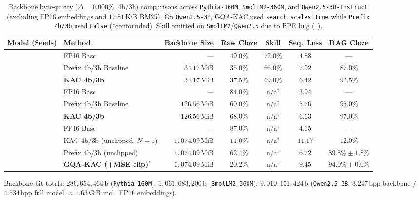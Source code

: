 \documentclass[10pt]{article} %
\newcommand{\gqakac}{\textsc{GQA-KAC}}
\newcommand{\bpp}{\mathrm{bpp}}
\begin{document}
\begin{table}[t]
\caption{Backbone byte-parity ($\Delta = 0.000\%$, 4b/3b) comparisons across \texttt{Pythia-160M}, \texttt{SmolLM2-360M}, and \texttt{Qwen2.5-3B-Instruct} (excluding FP16 embeddings and $17.81\,\text{KiB}$ BM25). On \texttt{Qwen2.5-3B}, \gqakac{} used \texttt{search\_scales=True} while \texttt{Prefix 4b/3b} used \texttt{False} ($*$confounded). Skill omitted on \texttt{SmolLM2}/\texttt{Qwen2.5} due to BPE bug ($\dagger$).}
\label{tab:matched_budget}
\begin{center}
\footnotesize\setlength{\tabcolsep}{3pt}
\begin{tabular}{l l r c c c c}
\toprule
\textbf{Model (Seeds)} & \textbf{Method} & \textbf{Backbone Size} & \textbf{Raw Cloze} & \textbf{Skill} & \textbf{Seq.\ Loss} & \textbf{RAG Cloze} \\
\midrule
{}
 & FP16 Base & --- & $49.0\%$ & $72.0\%$ & $4.88$ & --- \\
 & Prefix 4b/3b Baseline & $34.17\,\text{MiB}$ & $35.0\%$ & $66.0\%$ & $7.92$ & $87.0\%$ \\
 & \textbf{KAC 4b/3b} & $34.17\,\text{MiB}$ & $\mathbf{37.5\%}$ & $\mathbf{69.0\%}$ & $\mathbf{6.42}$ & $\mathbf{92.5\%}$ \\
\midrule
{}
 & FP16 Base & --- & $84.0\%$ & n/a$^\dagger$ & $3.94$ & --- \\
 & Prefix 4b/3b Baseline & $126.56\,\text{MiB}$ & $60.0\%$ & n/a$^\dagger$ & $\mathbf{5.76}$ & $96.0\%$ \\
 & \textbf{KAC 4b/3b} & $126.56\,\text{MiB}$ & $\mathbf{68.0\%}$ & n/a$^\dagger$ & $6.63$ & $\mathbf{97.0\%}$ \\
\midrule
{}
 & FP16 Base & --- & $87.0\%$ & n/a$^\dagger$ & $4.15$ & --- \\
 & KAC 4b/3b (unclipped, $N=1$) & $1{,}074.09\,\text{MiB}$ & $11.0\%$ & n/a$^\dagger$ & $11.17$ & $12.0\%$ \\
 & Prefix 4b/3b (unclipped) & $1{,}074.09\,\text{MiB}$ & $\mathbf{62.4\%}$ & n/a$^\dagger$ & $\mathbf{6.72}$ & $89.8\% \pm 1.8\%$ \\
 & \textbf{GQA-KAC (+MSE clip)}$^*$ & $1{,}074.09\,\text{MiB}$ & $20.2\%$ & n/a$^\dagger$ & $9.45$ & $\mathbf{94.0\% \pm 0.0\%}$ \\
\bottomrule
\end{tabular}
\par\vspace{2pt}
\parbox{\linewidth}{\scriptsize Backbone bit totals: $286{,}654{,}464\,\text{b}$ (\texttt{Pythia-160M}), $1{,}061{,}683{,}200\,\text{b}$ (\texttt{SmolLM2-360M}), $9{,}010{,}151{,}424\,\text{b}$ (\texttt{Qwen2.5-3B}: $3.247\,\bpp$ backbone / $4.534\,\bpp$ full model $\approx 1.63\,\text{GiB}$ incl.\ FP16 embeddings).}
\end{center}
\end{table}
\end{document}

